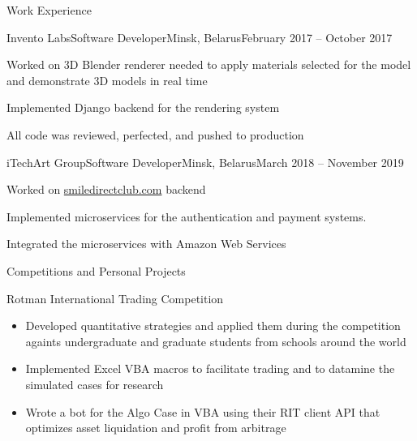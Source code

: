 \documentclass{article}
\newlength{\tabin}
\newlength{\secsep}
\newcommand{\lineunder}{\vspace*{-8pt} \\ \hspace*{-6pt} \hrulefill \\ \vspace*{-15pt}}
\newenvironment{tabbedsection}[1]{
  \begin{list}{}{
      \setlength{\itemsep}{0pt}
      \setlength{\labelsep}{0pt}
      \setlength{\labelwidth}{0pt}
      \setlength{\leftmargin}{\tabin}
      \setlength{\rightmargin}{\tabin}
      \setlength{\listparindent}{0pt}
      \setlength{\parsep}{0pt}
      \setlength{\parskip}{0pt}
      \setlength{\partopsep}{0pt}
      \setlength{\topsep}{#1}
    }
  \item[]
}{\end{list}}
\newenvironment{resume_section}[1]{
  \filbreak
  \vspace{2\secsep}
  \textsc{\large#1}
  \lineunder
  \begin{tabbedsection}{\secsep}
}{\end{tabbedsection}}
\newenvironment{resume_subsection}[2][]{
  \textbf{#2} \hfill {\footnotesize #1} \hspace{2em}
  \begin{tabbedsection}{0.5\secsep}
}{\end{tabbedsection}}
\newenvironment{subitems}{
  \renewcommand{\labelitemi}{-}
  \begin{itemize}
      \setlength{\labelsep}{1em}
}{\end{itemize}}
\newenvironment{resume_employer}[4]{
  \vspace{\secsep}
  \textbf{#1} \\ 
  \indent {\small #2} \hfill {\footnotesize#3 (#4)}
  \begin{tabbedsection}{0pt}
  \begin{subitems}
}{\end{subitems}\end{tabbedsection}}
\begin{document}
\begin{resume_section}{{\selectfont Work Experience}}
  \begin{resume_employer}{Invento Labs}{Software Developer}{Minsk, Belarus}{February 2017 -- October 2017}
    \item Worked on 3D Blender renderer needed to apply materials selected for the model and demonstrate 3D models in real time
    \item Implemented Django backend for the rendering system
    \item All code was reviewed, perfected, and pushed to production
  \end{resume_employer}
  
  \begin{resume_employer}{iTechArt Group}{Software Developer}{Minsk, Belarus}{March 2018 -- November 2019}
    \item Worked on \href{www.smiledirectclub.com}{smiledirectclub.com} backend
    \item Implemented microservices for the authentication and payment systems. 
    \item Integrated the microservices with Amazon Web Services
  \end{resume_employer}
\end{resume_section}

\begin{resume_section}{{\selectfont Competitions and Personal Projects}}
  \begin{resume_subsection}[(Feburary 2013)]{Rotman International Trading Competition}
  \begin{subitems}
    \item Developed quantitative strategies and applied them during the competition againts undergraduate and graduate students from schools around the world
    \item Implemented Excel VBA macros to facilitate trading and to datamine the simulated cases for research
    \item Wrote a bot for the Algo Case in VBA using their RIT client API that optimizes asset liquidation and profit from arbitrage
    \end{subitems}
  \end{resume_subsection}
\end{resume_section}
\end{document}
